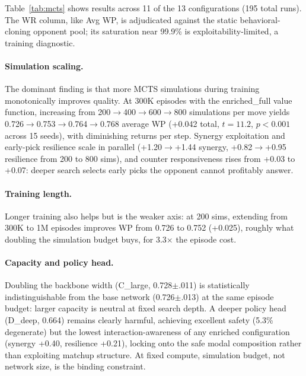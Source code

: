 \documentclass[journal]{IEEEtran}
\begin{document}
Table~\ref{tab:mcts} shows results across 11 of the 13 configurations (195 total runs). The WR column, like Avg WP, is adjudicated against the static behavioral-cloning opponent pool; its saturation near 99.9\% is exploitability-limited, a training diagnostic.

\paragraph{Simulation scaling.} The dominant finding is that more MCTS simulations during training monotonically improves quality. At 300K episodes with the enriched\_full value function, increasing from 200$\to$400$\to$600$\to$800 simulations per move yields 0.726$\to$0.753$\to$0.764$\to$0.768 average WP (+0.042 total, $t = 11.2$, $p < 0.001$ across 15 seeds), with diminishing returns per step. Synergy exploitation and early-pick resilience scale in parallel (+1.20$\to$+1.44 synergy, +0.82$\to$+0.95 resilience from 200 to 800 sims), and counter responsiveness rises from +0.03 to +0.07: deeper search selects early picks the opponent cannot profitably answer.

\paragraph{Training length.} Longer training also helps but is the weaker axis: at 200 sims, extending from 300K to 1M episodes improves WP from 0.726 to 0.752 (+0.025), roughly what doubling the simulation budget buys, for 3.3$\times$ the episode cost.

\paragraph{Capacity and policy head.} Doubling the backbone width (C\_large, 0.728$\pm$.011) is statistically indistinguishable from the base network (0.726$\pm$.013) at the same episode budget: larger capacity is neutral at fixed search depth. A deeper policy head (D\_deep, 0.664) remains clearly harmful, achieving excellent safety (5.3\% degenerate) but the lowest interaction-awareness of any enriched configuration (synergy +0.40, resilience +0.21), locking onto the safe modal composition rather than exploiting matchup structure. At fixed compute, simulation budget, not network size, is the binding constraint.
\end{document}
